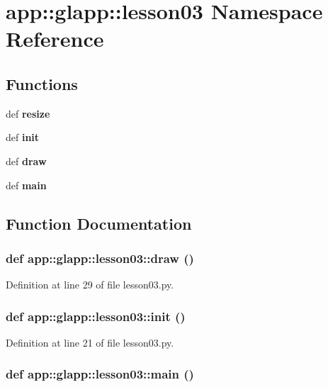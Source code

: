 \section{app::glapp::lesson03 Namespace Reference}
\label{namespaceapp_1_1glapp_1_1lesson03}


\subsection*{Functions}
\begin{CompactItemize}
\item 
def {\bf resize}
\item 
def {\bf init}
\item 
def {\bf draw}
\item 
def {\bf main}
\end{CompactItemize}


\subsection{Function Documentation}
\subsubsection{\setlength{\rightskip}{0pt plus 5cm}def app::glapp::lesson03::draw ()}\label{namespaceapp_1_1glapp_1_1lesson03_41af8f33070c68918f2d320b73b180b1}




Definition at line 29 of file lesson03.py.
\subsubsection{\setlength{\rightskip}{0pt plus 5cm}def app::glapp::lesson03::init ()}\label{namespaceapp_1_1glapp_1_1lesson03_753c6413e8dd2fe6d208caee4c869c20}




Definition at line 21 of file lesson03.py.
\subsubsection{\setlength{\rightskip}{0pt plus 5cm}def app::glapp::lesson03::main ()}\label{namespaceapp_1_1glapp_1_1lesson03_88e351806337eb2d3c28dc5f492bd72e}




